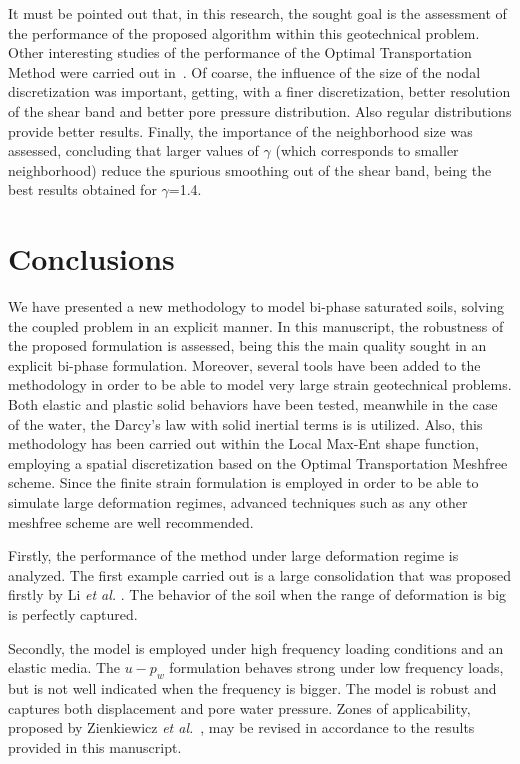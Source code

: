 \documentclass[twocolumn]{svjour3}          %
\begin{document}
It must be pointed out that, in this research, the sought goal is the assessment of the performance of the proposed algorithm within this geotechnical problem. Other interesting studies of the performance of the Optimal Transportation Method were carried out in~\cite{Navas:17b}. Of coarse, the influence of the size of the nodal discretization was important, getting, with a finer discretization, better resolution of the shear band and better pore pressure distribution. Also regular distributions provide better results. Finally, the importance of the neighborhood size was assessed, concluding that larger values of $\gamma$ (which corresponds to smaller neighborhood) reduce the spurious smoothing out of the shear band, being the best results obtained for $\gamma$=1.4.

\section{Conclusions}
\label{sec:6}

We have presented a new methodology to model bi-phase saturated  soils,  solving  the  coupled  problem  in  an  explicit manner. In this manuscript, the robustness of the proposed formulation is assessed, being this the main quality sought in an explicit bi-phase formulation. Moreover, several tools have been added to the methodology in order to be able to model very large strain geotechnical problems. Both elastic and plastic solid behaviors have been tested, meanwhile in the case of the water, the  Darcy's law with solid inertial terms is is utilized.  Also, this methodology has been carried out within the Local Max-Ent shape function, employing a spatial discretization based on the Optimal Transportation Meshfree scheme. Since the finite strain formulation is employed in order to be able to simulate large deformation regimes, advanced techniques such as any other meshfree scheme are well recommended.

Firstly, the performance of the method under large deformation regime is analyzed. The first example carried out is a large consolidation that was proposed firstly by Li \textit{et al.} \cite{LiBorja2004}. The behavior of the soil when the range of deformation is big is perfectly captured.

Secondly, the model is employed under high frequency loading conditions and an elastic media. The $u-p_w$ formulation behaves strong under low frequency loads, but is not well indicated when the frequency is bigger. The model is robust and captures both displacement and pore water pressure. Zones of applicability, proposed by Zienkiewicz \textit{et al.}~\cite{zienkiewicz1980}, may be revised in accordance to the results provided in this manuscript.
\end{document}
